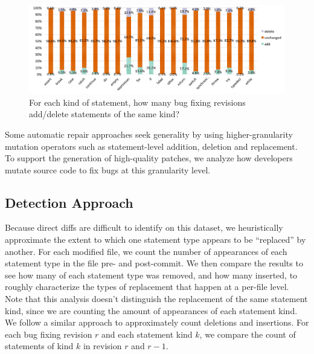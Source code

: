 \documentclass{sig-alternate-05-2015}
\begin{document}
\begin{figure}[!t] \centering \includegraphics[width=\textwidth]{StmtType}
	\vspace{-0.7cm} \caption{For each kind of statement, how many
	bug fixing revisions add/delete statements of the same kind?}
	\label{fig:StmtType} \end{figure}


Some automatic repair approaches seek generality by using
higher-granularity mutation operators such as statement-level addition, deletion and replacement. To
support the generation of high-quality patches, we 
analyze how developers mutate source code to fix bugs at this granularity
level. 

\subsection{Detection Approach}
Because direct diffs are difficult to identify on this dataset, we heuristically approximate the
extent to which one statement type appears to be ``replaced'' by another.
For each modified file, we count the number of
appearances of each statement type in the file pre- and post-commit.  We then
compare the results to see how many of each statement type was removed, and how
many inserted, to roughly characterize the types of replacement that happen at a
per-file level.
Note that this analysis doesn't distinguish the
replacement of the same statement kind, since we are counting the amount of
appearances of each statement kind.
%
We follow a similar approach to approximately count deletions and
insertions. 
For each bug fixing revision $r$ and each statement kind $k$, we compare the
count of statements of kind $k$ in revision $r$ and $r-1$.
\end{document}
